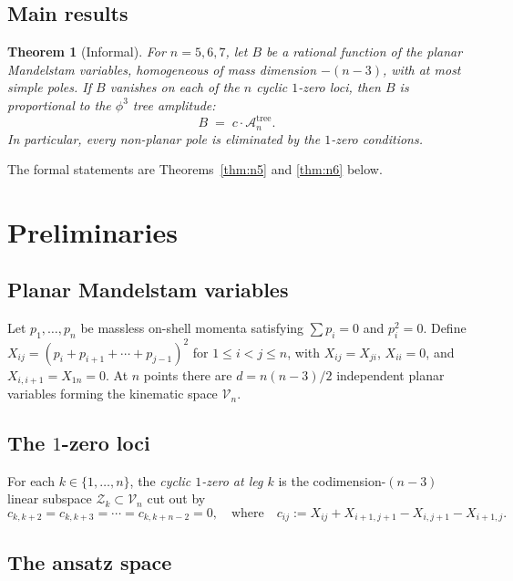 \documentclass[11pt]{article}
\theoremstyle{plain}
\newtheorem{theorem}{Theorem}[section]
\theoremstyle{definition}
\newcommand{\cA}{\mathcal{A}}
\newcommand{\cZ}{\mathcal{Z}}
\newcommand{\cV}{\mathcal{V}}
\begin{document}
\subsection{Main results}

\begin{theorem}[Informal]
For $n = 5, 6, 7$, let $B$ be a rational function of the planar Mandelstam variables,
homogeneous of mass dimension $-(n-3)$, with at most simple poles. If $B$ vanishes on
each of the $n$ cyclic $1$-zero loci, then $B$ is proportional to the $\phi^3$ tree
amplitude:
\[
B \;=\; c \cdot \cA_n^{\mathrm{tree}}.
\]
In particular, every non-planar pole is eliminated by the $1$-zero conditions.
\end{theorem}

The formal statements are Theorems~\ref{thm:n5} and \ref{thm:n6} below.

\section{Preliminaries}
\label{sec:prelim}

\subsection{Planar Mandelstam variables}

Let $p_1, \ldots, p_n$ be massless on-shell momenta satisfying $\sum p_i = 0$ and
$p_i^2 = 0$. Define $X_{ij} = (p_i + p_{i+1} + \cdots + p_{j-1})^2$ for
$1 \le i < j \le n$, with $X_{ij} = X_{ji}$, $X_{ii} = 0$, and
$X_{i,i+1} = X_{1n} = 0$. At $n$ points there are $d = n(n-3)/2$ independent planar
variables forming the kinematic space $\cV_n$.

\subsection{The $1$-zero loci}

For each $k \in \{1, \ldots, n\}$, the \emph{cyclic $1$-zero at leg $k$} is the
codimension-$(n-3)$ linear subspace $\cZ_k \subset \cV_n$ cut out by
\begin{equation}
c_{k, k+2} = c_{k, k+3} = \cdots = c_{k, k+n-2} = 0,
\quad\text{where}\quad
c_{ij} := X_{ij} + X_{i+1,j+1} - X_{i,j+1} - X_{i+1,j}.
\label{eq:cdef}
\end{equation}

\subsection{The ansatz space}
\end{document}
